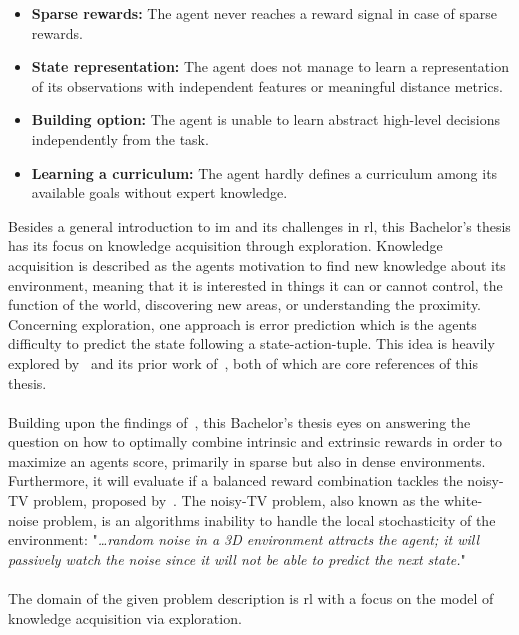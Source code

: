 \documentclass[draft,final]{vutinfth} %
\newcommand{\p}[1]{see p. #1}
\begin{document}
    \begin{itemize}
        \item \textbf{Sparse rewards:} The agent never reaches a reward signal in case of sparse rewards.
        \item \textbf{State representation:} The agent does not manage to learn a representation of its observations with independent features or meaningful distance metrics.
        \item \textbf{Building option:} The agent is unable to learn abstract high-level decisions independently from the task.
        \item \textbf{Learning a curriculum:} The agent hardly defines a curriculum among its available goals without expert knowledge.
    \end{itemize}

    Besides a general introduction to \gls{im} and its challenges in \gls{rl}, this Bachelor's thesis has its focus on knowledge acquisition through exploration.
    Knowledge acquisition is described as the agents motivation to find new knowledge about its environment, meaning that it is interested in things it can or cannot control, the function of the world, discovering new areas, or understanding the proximity.
    Concerning exploration, one approach is error prediction which is the agents difficulty to predict the state following a state-action-tuple.
    This idea is heavily explored by~\cite{burda_large-scale_2018-1} and its prior work of~\cite{pathak_curiosity-driven_2017-1}, both of which are core references of this thesis.
    \\\\
    Building upon the findings of~\citeauthor{burda_large-scale_2018-1}, this Bachelor's thesis eyes on answering the question on how to optimally combine intrinsic and extrinsic rewards in order to maximize an agents score, primarily in sparse but also in dense environments.
    Furthermore, it will evaluate if a balanced reward combination tackles the noisy-TV problem, proposed by~\cite{schmidhuber_formal_2010}.
    The noisy-TV problem, also known as the white-noise problem, is an algorithms inability to handle the local stochasticity of the environment: "\textit{\ldots random noise in a 3D environment attracts the agent; it will passively watch the noise since it will not be able to predict the next state.}"\cite[\p{10}]{aubret_survey_2019}
    \\\\
    The domain of the given problem description is \gls{rl} with a focus on the model of knowledge acquisition via exploration.
\end{document}
